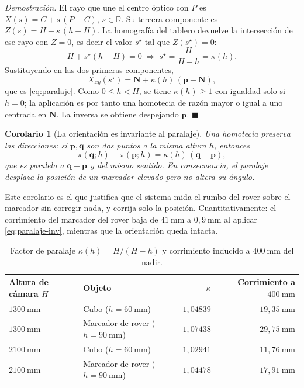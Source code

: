 \documentclass[11pt,a4paper]{article}
\newtheorem{corolario}[teorema]{Corolario}
\theoremstyle{definition}
\newenvironment{demo}{\par\noindent\textit{Demostración.}\;}{\hfill$\blacksquare$\par\medskip}
\newcommand{\R}{\mathbb{R}}
\newcommand{\pp}{\mathbf{p}}
\newcommand{\qq}{\mathbf{q}}
\newcommand{\NN}{\mathbf{N}}
\begin{document}
\begin{demo}
El rayo que une el centro óptico con $P$ es
$X(s) = C + s\,(P - C)$, $s\in\R$. Su tercera componente es
$Z(s) = H + s\,(h - H)$. La homografía del tablero devuelve la intersección de ese rayo
con $Z=0$, es decir el valor $s^\star$ tal que $Z(s^\star)=0$:
\[
  H + s^\star (h-H) = 0
  \;\Longrightarrow\;
  s^\star = \frac{H}{H-h} = \kappa(h).
\]
Sustituyendo en las dos primeras componentes,
\[
  X_{xy}(s^\star) = \NN + \kappa(h)\,(\pp - \NN),
\]
que es \eqref{eq:paralaje}. Como $0\le h<H$, se tiene $\kappa(h)\ge 1$ con igualdad
solo si $h=0$; la aplicación es por tanto una homotecia de razón mayor o igual a uno
centrada en $\NN$. La inversa se obtiene despejando $\pp$.
\end{demo}

\begin{corolario}[La orientación es invariante al paralaje]
\label{cor:orientacion}
Una homotecia preserva las direcciones: si $\pp,\qq$ son dos puntos a la misma altura
$h$, entonces
\[
  \pi(\qq;h) - \pi(\pp;h) = \kappa(h)\,(\qq - \pp),
\]
que es paralelo a $\qq-\pp$ y del mismo sentido. En consecuencia, el paralaje desplaza
la \emph{posición} de un marcador elevado pero \emph{no altera su ángulo}.
\end{corolario}

Este corolario es el que justifica que el sistema mida el rumbo del rover sobre el
marcador sin corregir nada, y corrija solo la posición. Cuantitativamente: el
corrimiento del marcador del rover baja de $41\ \mathrm{mm}$ a $0{,}9\ \mathrm{mm}$ al
aplicar \eqref{eq:paralaje-inv}, mientras que la orientación queda intacta.

\begin{table}[htbp]
\centering
\caption{Factor de paralaje $\kappa(h)=H/(H-h)$ y corrimiento inducido a
$400\ \mathrm{mm}$ del nadir.}
\begin{tabular}{llrr}
\toprule
Altura de cámara $H$ & Objeto & $\kappa$ & Corrimiento a $400\ \mathrm{mm}$ \\
\midrule
$1300\ \mathrm{mm}$ & Cubo ($h=60\ \mathrm{mm}$)            & $1{,}04839$ & $19{,}35\ \mathrm{mm}$\\
$1300\ \mathrm{mm}$ & Marcador de rover ($h=90\ \mathrm{mm}$) & $1{,}07438$ & $29{,}75\ \mathrm{mm}$\\
$2100\ \mathrm{mm}$ & Cubo ($h=60\ \mathrm{mm}$)            & $1{,}02941$ & $11{,}76\ \mathrm{mm}$\\
$2100\ \mathrm{mm}$ & Marcador de rover ($h=90\ \mathrm{mm}$) & $1{,}04478$ & $17{,}91\ \mathrm{mm}$\\
\bottomrule
\end{tabular}
\label{tab:paralaje}
\end{table}
\end{document}
